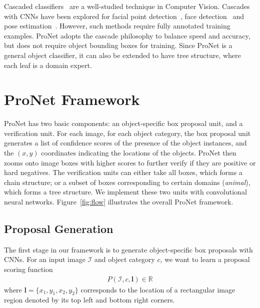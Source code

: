 \documentclass[10pt,twocolumn,letterpaper]{article}
\begin{document}
Cascaded classifiers~\cite{DBLP:conf/cvpr/ViolaJ01} are a well-studied technique in Computer Vision. Cascades with CNNs have been explored for facial point detection~\cite{DBLP:conf/cvpr/SunWT13}, face detection~\cite{DBLP:conf/cvpr/LiLSBH15} and pose estimation~\cite{DBLP:journals/corr/ToshevS13}. However, such methods require fully annotated training examples. ProNet adopts the cascade philosophy to balance speed and accuracy, but does not require object bounding boxes for training. Since ProNet is a general object classifier, it can also be extended to have tree structure, where each leaf is a domain expert.

\section{ProNet Framework}

ProNet has two basic components: an object-specific box proposal unit, and a verification unit. For each image, for each object category, the box proposal unit generates a list of confidence scores of the presence of the object instances, and the $(x,y)$ coordinates indicating the locations of the objects. ProNet then zooms onto image boxes with higher scores to further verify if they are positive or hard negatives. The verification units can either take all boxes, which forms a chain structure; or a subset of boxes corresponding to certain domains (\eg \textit{animal}), which forms a tree structure. We implement these two units with convolutional neural networks. Figure~\ref{fig:flow} illustrates the overall ProNet framework.





\subsection{Proposal Generation}
The first stage in our framework is to generate object-specific box proposals with CNNs. For an input image $\mathcal{I}$ and object category $c$, we want to learn a proposal scoring function
\begin{align*}
P(\mathcal{I}, c, \mathbf{l}) \in \mathbb{R}
\end{align*}
where $\mathbf{l} = \{x_1, y_1, x_2, y_2\}$ corresponds to the location of a rectangular image region denoted by its top left and bottom right corners.
\end{document}

